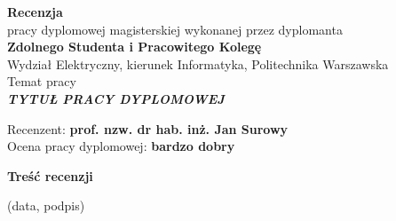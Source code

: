 \newpage
\begin{center}
 {\large\bf  Recenzja } \\
pracy dyplomowej magisterskiej wykonanej przez dyplomanta\\
{\bf Zdolnego Studenta i Pracowitego Kolegę} \\
 Wydział Elektryczny, kierunek Informatyka,  Politechnika Warszawska\\
Temat pracy\\
\textit{\bf
TYTUŁ PRACY DYPLOMOWEJ
}\\
\end{center}
\medskip
\noindent
Recenzent: {\bf prof. nzw. dr hab. inż. Jan Surowy}\\
Ocena pracy dyplomowej: {\bf bardzo dobry}
\medskip


\centerline{\bf Treść recenzji}
   

\vskip 1cm
{
\raggedleft
(data, podpis)\kern1cm

}
